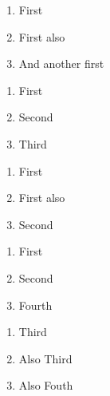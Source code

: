 \documentclass{beamer}
\begin{document}
\begin{frame}
    \begin{enumerate}
        \item First
        \item First also
        \item And another first
    \end{enumerate}
\end{frame}

\begin{frame}
    \begin{enumerate}[<+->]
        \item First
        \item Second
        \item Third
    \end{enumerate}
\end{frame}


\begin{frame}
    \begin{enumerate}
        \item First
        \item First also
        \item<2> Second
    \end{enumerate}
\end{frame}

\begin{frame}[<.->]
    \begin{enumerate}[<+->]
        \item First
        \item Second
        \item<4-> Fourth
    \end{enumerate}

    \begin{enumerate}
        \item Third
        \item Also Third
        \item<4-> Also Fouth
    \end{enumerate}
\end{frame}
\end{document}
